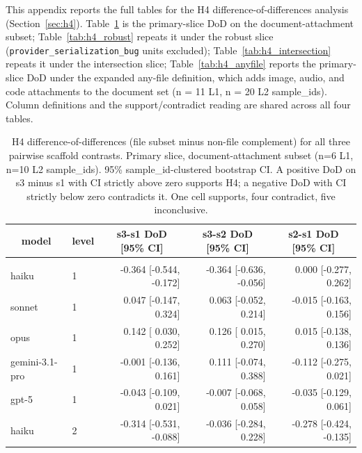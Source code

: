 \documentclass[10pt]{article} %
\begin{document}
    This appendix reports the full tables for the H4 difference-of-differences analysis (Section~\ref{sec:h4}). Table~\ref{tab:h4_dod} is the primary-slice DoD on the document-attachment subset; Table~\ref{tab:h4_robust} repeats it under the robust slice (\texttt{provider\_serialization\_bug} units excluded); Table~\ref{tab:h4_intersection} repeats it under the intersection slice; Table~\ref{tab:h4_anyfile} reports the primary-slice DoD under the expanded any-file definition, which adds image, audio, and code attachments to the document set (n = 11 L1, n = 20 L2 sample\_ids). Column definitions and the support/contradict reading are shared across all four tables.

    \begin{table}[h]
        \caption{H4 difference-of-differences (file subset minus non-file complement) for all three pairwise scaffold contrasts. Primary slice, document-attachment subset (n=6 L1, n=10 L2 sample\_ids). 95\% sample\_id-clustered bootstrap CI. A positive DoD on s3 minus s1 with CI strictly above zero supports H4; a negative DoD with CI strictly below zero contradicts it. One cell supports, four contradict, five inconclusive.}
        \label{tab:h4_dod}
        \begin{center}
        \small
        \begin{tabular}{llrrr}
            \multicolumn{1}{c}{\bf model} & \multicolumn{1}{c}{\bf level} & \multicolumn{1}{c}{\bf s3-s1 DoD [95\% CI]} & \multicolumn{1}{c}{\bf s3-s2 DoD [95\% CI]} & \multicolumn{1}{c}{\bf s2-s1 DoD [95\% CI]} \\
            \hline \\
            haiku          & 1 & -0.364 [-0.544, -0.172] & -0.364 [-0.636, -0.056] &  0.000 [-0.277,  0.262] \\
            sonnet         & 1 &  0.047 [-0.147,  0.324] &  0.063 [-0.052,  0.214] & -0.015 [-0.163,  0.156] \\
            opus           & 1 &  0.142 [ 0.030,  0.252] &  0.126 [ 0.015,  0.270] &  0.015 [-0.138,  0.136] \\
            gemini-3.1-pro & 1 & -0.001 [-0.136,  0.161] &  0.111 [-0.074,  0.388] & -0.112 [-0.275,  0.021] \\
            gpt-5          & 1 & -0.043 [-0.109,  0.021] & -0.007 [-0.068,  0.058] & -0.035 [-0.129,  0.061] \\
            haiku          & 2 & -0.314 [-0.531, -0.088] & -0.036 [-0.284,  0.228] & -0.278 [-0.424, -0.135] \\

\end{tabular}
\end{center}
\end{table}
\end{document}

